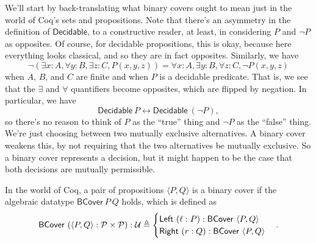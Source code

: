 We'll start by back-translating what binary covers ought to mean just in the world of Coq's sets and propositions. Note that there's an asymmetry in the definition of $\mathsf{Decidable}$, to a constructive reader, at least, in considering $P$ and $\neg P$ as opposites. Of course, for decidable propositions, this is okay, because here everything looks classical, and so they are in fact opposites. Similarly, we have
\[
\neg \left( \exists x : A, \forall y : B, \exists z : C, P(x, y, z) \right) = \forall x : A, \exists y : B, \forall z : C, \neg P(x, y, z)
\]
when $A$, $B$, and $C$ are finite and when $P$ is a decidable predicate. That is, we see that the $\exists$ and $\forall$ quantifiers become opposites, which are flipped by negation. In particular, we have
\[
\mathsf{Decidable}\ P \leftrightarrow \mathsf{Decidable}\ (\neg P),
\]
so there's no reason to think of $P$ as the ``true'' thing and $\neg P$ as the ``false'' thing. We're just choosing between two mutually exclusive alternatives. A binary cover weakens this, by not requiring that the two alternatives be mutually exclusive. So a binary cover represents a decision, but it might happen to be the case that both decisions are mutually permissible.

In the world of Coq, a pair of propositions $\langle P, Q \rangle$ is a binary cover if the algebraic datatype $\mathsf{BCover}\ P\ Q$ holds, which is defined as
\[
\mathsf{BCover}\ (\langle P, Q \rangle : \Prop \times \Prop) : \Type \triangleq
  \begin{cases}
  \mathsf{Left}\ (\ell : P) : \mathsf{BCover}\ \langle P, Q \rangle
  \\ \mathsf{Right}\ (r : Q) : \mathsf{BCover}\ \langle P, Q \rangle
  \end{cases}.
\]

